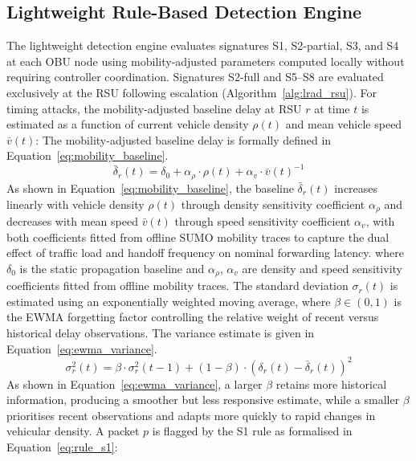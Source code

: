 \documentclass[12pt, a4paper]{report}
\begin{document}
\subsection{Lightweight Rule-Based Detection Engine}
\label{sec:rule_based}

The lightweight detection engine evaluates signatures
S1, S2-partial, S3, and S4 at each \ac{OBU} node using
mobility-adjusted parameters computed locally without
requiring controller coordination. Signatures S2-full and
S5--S8 are evaluated exclusively at the \ac{RSU} following
escalation (Algorithm~\ref{alg:lrad_rsu}). For timing attacks, the
mobility-adjusted baseline delay at RSU $r$ at time $t$ is estimated
as a function of current vehicle density $\rho(t)$ and mean vehicle
speed $\bar{v}(t)$:
The mobility-adjusted baseline delay is formally defined in
Equation~\eqref{eq:mobility_baseline}.
\begin{equation}
\bar{\delta}_r(t) = \delta_0 + \alpha_\rho \cdot \rho(t) + \alpha_v \cdot \bar{v}(t)^{-1}
\label{eq:mobility_baseline}
\end{equation}
As shown in Equation~\eqref{eq:mobility_baseline}, the baseline
$\bar{\delta}_r(t)$ increases linearly with vehicle density $\rho(t)$
through density sensitivity coefficient $\alpha_\rho$ and decreases with mean speed
$\bar{v}(t)$ through speed sensitivity coefficient $\alpha_v$, with both coefficients
fitted from offline SUMO mobility traces to capture the dual effect of
traffic load and handoff frequency on nominal forwarding latency.
where $\delta_0$ is the static propagation baseline and $\alpha_\rho$,
$\alpha_v$ are density and speed sensitivity coefficients fitted from
offline mobility traces. The standard deviation $\sigma_r(t)$ is
estimated using an exponentially weighted moving average,
where $\beta \in (0,1)$ is the EWMA forgetting factor controlling
the relative weight of recent versus historical delay observations.
The variance estimate is given in Equation~\eqref{eq:ewma_variance}.
\begin{equation}
\sigma_r^2(t) = \beta \cdot \sigma_r^2(t-1)
+ (1-\beta)\cdot\left(\delta_r(t) - \bar{\delta}_r(t)\right)^2
\label{eq:ewma_variance}
\end{equation}
As shown in Equation~\eqref{eq:ewma_variance}, a larger $\beta$
retains more historical information, producing a smoother but less
responsive estimate, while a smaller $\beta$ prioritises recent
observations and adapts more quickly to rapid changes in vehicular
density.
A packet $p$ is flagged by the S1 rule as formalised in
Equation~\eqref{eq:rule_s1}:
\end{document}
